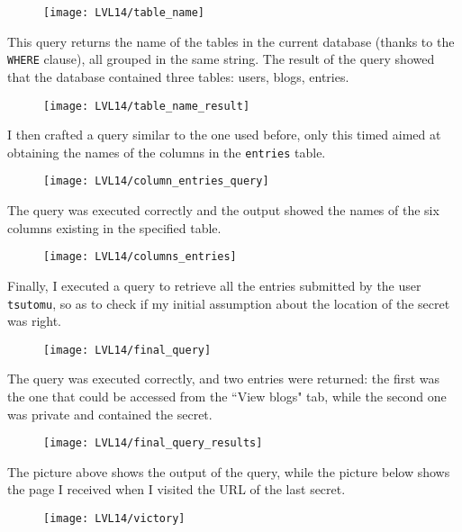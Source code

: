 \documentclass[12pt,a4paper]{article}
\begin{document}
	\begin{figure}[H]
		\centering
		\texttt{[image: LVL14/table\_name]}
		\label{fig:tablename}
	\end{figure}
	This query returns the name of the tables in the current database (thanks to the \texttt{WHERE} clause), all grouped in the same string. The result of the query showed that the database contained three tables: users, blogs, entries.
		\begin{figure}[H]
		\centering
		\texttt{[image: LVL14/table\_name\_result]}
		\label{fig:tablenameresult}
	\end{figure}
	I then crafted a query similar to the one used before, only this timed aimed at obtaining the names of the columns in the \texttt{entries} table.
	\begin{figure}[H]
	\centering
	\texttt{[image: LVL14/column\_entries\_query]}
	\label{fig:columnentryquery}
	\end{figure}
	The query was executed correctly and the output showed the names of the six columns existing in the specified table.
	\begin{figure}[H]
	\centering
	\texttt{[image: LVL14/columns\_entries]}
	\label{fig:columnentry}
	\end{figure}
	Finally, I executed a query to retrieve all the entries submitted by the user \texttt{tsutomu}, so as to check if my initial assumption about the location of the secret was right.
	\begin{figure}[H]
		\centering
		\texttt{[image: LVL14/final\_query]}
		\label{fig:finalquery}
	\end{figure}
	The query was executed correctly, and two entries were returned: the first was the one that could be accessed from the ``View blogs" tab, while the second one was private and contained the secret. 
	\begin{figure}[H]
		\centering
		\texttt{[image: LVL14/final\_query\_results]}
		\label{fig:finalqueryresult}
	\end{figure}
	The picture above shows the output of the query, while the picture below shows the page I received when I visited the URL of the last secret.
	\begin{figure}[H]
		\centering
		\texttt{[image: LVL14/victory]}
		\label{fig:victory}
	\end{figure}
	
	
	
	
	
\end{document}
